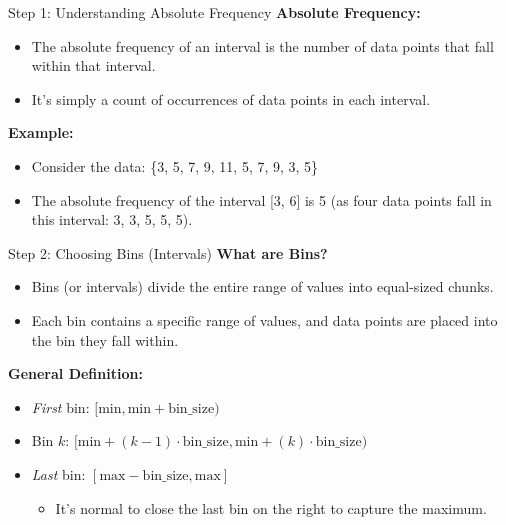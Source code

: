 \documentclass[handout]{beamer} %
\begin{document}
\begin{frame}{Step 1: Understanding Absolute Frequency}
    \textbf{Absolute Frequency:}
    \begin{itemize}
        \item The absolute frequency of an interval is the number of data points that fall within that interval.
        \item It's simply a count of occurrences of data points in each interval.
    \end{itemize}
    
    \vspace{0.5cm}
    \textbf{Example:}
    \begin{itemize}
        \item Consider the data: \{3, 5, 7, 9, 11, 5, 7, 9, 3, 5\}
        \item The absolute frequency of the interval [3, 6] is 5 (as four data points fall in this interval: 3, 3, 5, 5, 5).
    \end{itemize}
\end{frame}

\begin{frame}{Step 2: Choosing Bins (Intervals)}
    \textbf{What are Bins?}
    \begin{itemize}
        \item Bins (or intervals) divide the entire range of values into equal-sized chunks.
        \item Each bin contains a specific range of values, and data points are placed into the bin they fall within.
    \end{itemize}
    
    \vspace{0.5cm}
    
    \textbf{General Definition:}
    \begin{itemize}
        \item \emph{First} bin: \([ \text{min}, \text{min} + \text{bin\_size} )\)
        \item Bin \(k\): \([ \text{min} + (k-1)\cdot\text{bin\_size} , \text{min} +  (k) \cdot \text{bin\_size}  )\)
        \item \emph{Last} bin: \([ \text{max}-\text{bin\_size}, \text{max}   ]\)
        \begin{itemize}
            \item It’s normal to close the last bin on the right to capture the maximum.
        \end{itemize}
    \end{itemize}
\end{frame}
\end{document}
